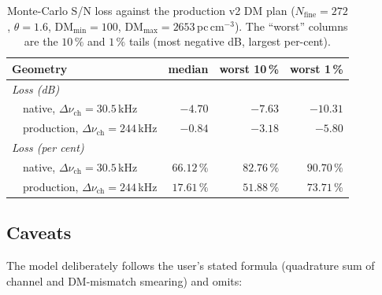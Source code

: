 \documentclass[11pt,a4paper]{article}
\newcommand{\DM}{\mathrm{DM}}
\newcommand{\dnu}{\Delta\nu_\mathrm{ch}}
\begin{document}
\begin{table}[ht]
\centering
\caption{Monte-Carlo S/N loss against the production v2 DM plan
($N_\mathrm{fine}=272$, $\theta=1.6$, $\DM_\mathrm{min}=100$,
$\DM_\mathrm{max}=2653$\,pc\,cm$^{-3}$).  The ``worst'' columns are the
$10\,\%$ and $1\,\%$ tails (most negative dB, largest per-cent).}
\label{tab:mcloss}
\small
\begin{tabular}{lrrr}
\toprule
Geometry           & median           & worst 10\,\%     & worst 1\,\% \\
\midrule
\multicolumn{4}{l}{\emph{Loss (dB)}} \\
~~native, $\dnu = 30.5$\,kHz        & $-4.70$          & $-7.63$          & $-10.31$    \\
~~production, $\dnu = 244$\,kHz     & $-0.84$          & $-3.18$          & $-5.80$     \\
\midrule
\multicolumn{4}{l}{\emph{Loss (per cent)}} \\
~~native, $\dnu = 30.5$\,kHz        & $66.12\,\%$      & $82.76\,\%$      & $90.70\,\%$ \\
~~production, $\dnu = 244$\,kHz     & $17.61\,\%$      & $51.88\,\%$      & $73.71\,\%$ \\
\bottomrule
\end{tabular}
\end{table}

\subsection{Caveats}

The model deliberately follows the user's stated formula
(quadrature sum of channel and DM-mismatch smearing) and omits:
\end{document}
